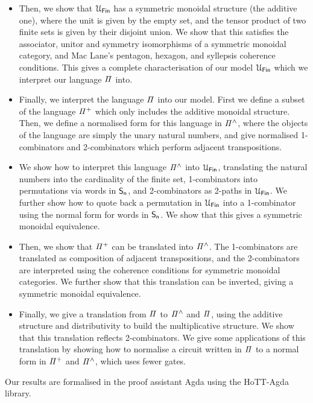 \begin{itemize}[leftmargin=*]
\item Then, we show that $\UFin$ has a symmetric monoidal structure (the additive one), where the unit is given by the empty set, and the tensor product of two finite sets is given by their disjoint union. We show that this satisfies the associator, unitor and symmetry isomorphisms of a symmetric monoidal category, and Mac Lane's pentagon, hexagon, and syllepsis coherence conditions. This gives a complete characterisation of our model $\UFin$ which we interpret our language $\mathit{\Pi}$ into.
\item Finally, we interpret the language $\mathit{\Pi}$ into our model. First we define a subset of the language $\mathit{{\Pi}^{+}}$ which only includes the additive monoidal structure. Then, we define a normalised form for this language in $\mathit{{\Pi}^{\wedge}}$, where the objects of the language are simply the unary natural numbers, and give normalised 1-combinators and 2-combinators which perform adjacent transpositions.
\item We show how to interpret this language $\mathit{{\Pi}^{\wedge}}$ into $\UFin$, translating the natural numbers into the cardinality of the finite set, 1-combinators into permutations via words in $\Sn$, and 2-combinators as 2-paths in $\UFin$. We further show how to quote back a permutation in $\UFin$ into a 1-combinator using the normal form for words in $\Sn$. We show that this gives a symmetric monoidal equivalence.
\item Then, we show that $\mathit{{\Pi}^{+}}$ can be translated into $\mathit{{\Pi}^{\wedge}}$. The 1-combinators are translated as composition of adjacent transpositions, and the 2-combinators are interpreted using the coherence conditions for symmetric monoidal categories. We further show that this translation can be inverted, giving a symmetric monoidal equivalence.
\item Finally, we give a translation from $\mathit{\Pi}$ to $\mathit{{\Pi}^{\wedge}}$ and $\mathit{\Pi}$, using the additive structure and distributivity to build the multiplicative structure. We show that this translation reflects 2-combinators. We give some applications of this translation by showing how to normalise a circuit written in $\mathit{\Pi}$ to a normal form in $\mathit{{\Pi}^{+}}$ and $\mathit{{\Pi}^{\wedge}}$, which uses fewer gates.
\end{itemize}

Our results are formalised in the proof assistant Agda using the HoTT-Agda library.


